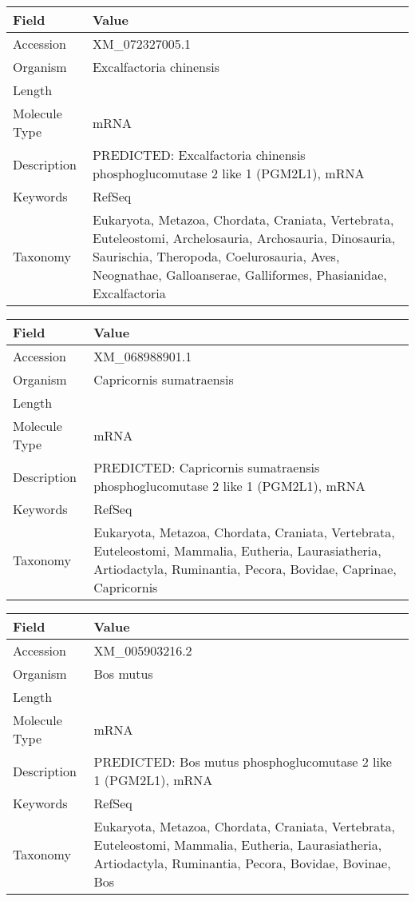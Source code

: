 \documentclass[10pt]{article}
\begin{document}
\vspace{1em}
{\footnotesize
\begin{longtable}{>{\raggedright\arraybackslash}p{4.5cm} >{\raggedright\arraybackslash}p{11.5cm}}
\textbf{Field} & \textbf{Value} \\
\hline
Accession & XM\_072327005.1 \\
Organism & Excalfactoria chinensis \\
Length & 5417 \\
Molecule Type & mRNA \\
Description & PREDICTED: Excalfactoria chinensis phosphoglucomutase 2 like 1 (PGM2L1), mRNA \\
Keywords & RefSeq \\
Taxonomy & Eukaryota, Metazoa, Chordata, Craniata, Vertebrata, Euteleostomi, Archelosauria, Archosauria, Dinosauria, Saurischia, Theropoda, Coelurosauria, Aves, Neognathae, Galloanserae, Galliformes, Phasianidae, Excalfactoria \\
\end{longtable}
}

\vspace{1em}
{\footnotesize
\begin{longtable}{>{\raggedright\arraybackslash}p{4.5cm} >{\raggedright\arraybackslash}p{11.5cm}}
\textbf{Field} & \textbf{Value} \\
\hline
Accession & XM\_068988901.1 \\
Organism & Capricornis sumatraensis \\
Length & 1891 \\
Molecule Type & mRNA \\
Description & PREDICTED: Capricornis sumatraensis phosphoglucomutase 2 like 1 (PGM2L1), mRNA \\
Keywords & RefSeq \\
Taxonomy & Eukaryota, Metazoa, Chordata, Craniata, Vertebrata, Euteleostomi, Mammalia, Eutheria, Laurasiatheria, Artiodactyla, Ruminantia, Pecora, Bovidae, Caprinae, Capricornis \\
\end{longtable}
}

\vspace{1em}
{\footnotesize
\begin{longtable}{>{\raggedright\arraybackslash}p{4.5cm} >{\raggedright\arraybackslash}p{11.5cm}}
\textbf{Field} & \textbf{Value} \\
\hline
Accession & XM\_005903216.2 \\
Organism & Bos mutus \\
Length & 7612 \\
Molecule Type & mRNA \\
Description & PREDICTED: Bos mutus phosphoglucomutase 2 like 1 (PGM2L1), mRNA \\
Keywords & RefSeq \\
Taxonomy & Eukaryota, Metazoa, Chordata, Craniata, Vertebrata, Euteleostomi, Mammalia, Eutheria, Laurasiatheria, Artiodactyla, Ruminantia, Pecora, Bovidae, Bovinae, Bos \\
\end{longtable}
}
\end{document}
